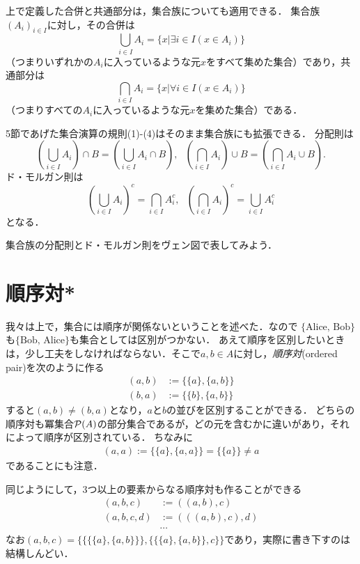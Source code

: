 \documentclass[11pt,a4paper]{jsarticle}
\begin{document}
上で定義した合併と共通部分は，集合族についても適用できる．
集合族$(A_i)_{i\in I}$に対し，その合併は
\[
 \bigcup_{i \in I} A_i = \{ x | \exists i \in I (x \in A_i) \}
\]
（つまりいずれかの$A_i$に入っているような元$x$をすべて集めた集合）であり，共通部分は
\[
 \bigcap_{i \in I} A_i = \{ x | \forall i \in I (x \in A_i) \}
\]
（つまりすべての$A_i$に入っているような元$x$を集めた集合）である．

5節であげた集合演算の規則(1)-(4)はそのまま集合族にも拡張できる．
分配則は
\[
 \left( \bigcup_{i \in I} A_i \right) \cap B = \left( \bigcup_{i \in I} A_i  \cap B \right) , \ \ \ 
 \left( \bigcap_{i \in I} A_i \right) \cup B = \left( \bigcap_{i \in I} A_i  \cup B \right). 
\]
ド・モルガン則は
\[
 \left( \bigcup_{i \in I} A_i \right)^c = \bigcap_{i \in I} A_i^c, \ \ \ 
 \left( \bigcap_{i \in I} A_i \right)^c = \bigcup_{i \in I} A_i^c
\]
となる．

\begin{exercise}
集合族の分配則とド・モルガン則をヴェン図で表してみよう．
\end{exercise} 




\section{順序対*}
我々は上で，集合には順序が関係ないということを述べた．なので $\{\text{Alice, Bob}\}$も$\{\text{Bob, Alice}\}$も集合としては区別がつかない．
あえて順序を区別したいときは，少し工夫をしなければならない．そこで$a, b \in A$に対し，\emph{順序対}(ordered pair)を次のように作る
\begin{align*}
 (a, b) &:= \{ \{a\}, \{a, b\} \} \\
 (b, a) &:= \{ \{b\}, \{a, b\} \} 
\end{align*}
すると$(a,b) \neq (b,a)$となり，$a$と$b$の並びを区別することができる．
どちらの順序対も冪集合$\mathcal{P}(A)$の部分集合であるが，どの元を含むかに違いがあり，それによって順序が区別されている．
ちなみに
\begin{align*}
 (a, a) := \{ \{a\}, \{a, a\} \} = \{ \{a\} \} \neq a 
\end{align*}
であることにも注意．

同じようにして，3つ以上の要素からなる順序対も作ることができる
\begin{align*}
 (a, b, c) &:= ((a,b), c) \\
 (a, b, c, d) &:= (((a,b), c), d) \\
&\cdots
\end{align*}
なお$ (a, b, c) = \{\{\{\{a\}, \{a,b\}\}\}, \{\{\{a\}, \{a,b\}\}, c\}\}$であり，実際に書き下すのは結構しんどい．
\end{document}
